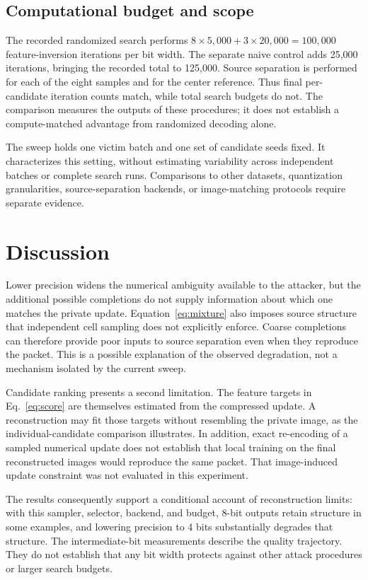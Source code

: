 \documentclass[10pt,twocolumn]{article}
\begin{document}
\subsection{Computational budget and scope}
\label{sec:budget}
The recorded randomized search performs
$8\times5{,}000+3\times20{,}000=100{,}000$ feature-inversion iterations
per bit width. The separate naive control adds 25,000 iterations,
bringing the recorded total to 125,000. Source separation is performed
for each of the eight samples and for the center reference. Thus final
per-candidate iteration counts match, while total search budgets do not.
The comparison measures the outputs of these procedures; it does not
establish a compute-matched advantage from randomized decoding alone.

The sweep holds one victim batch and one set of candidate seeds fixed.
It characterizes this setting, without estimating variability across
independent batches or complete search runs. Comparisons to other
datasets, quantization granularities, source-separation backends, or
image-matching protocols require separate evidence.

\section{Discussion}
\label{sec:discussion}
Lower precision widens the numerical ambiguity available to the attacker,
but the additional possible completions do not supply information about
which one matches the private update. Equation~\ref{eq:mixture} also
imposes source structure that independent cell sampling does not
explicitly enforce. Coarse completions can therefore provide poor
inputs to source separation even when they reproduce the packet.
This is a possible explanation of the observed degradation, not a
mechanism isolated by the current sweep.

Candidate ranking presents a second limitation. The feature targets in
Eq.~\ref{eq:score} are themselves estimated from the compressed update.
A reconstruction may fit those targets without resembling the private
image, as the individual-candidate comparison illustrates. In addition,
exact re-encoding of a sampled numerical update does not establish that
local training on the final reconstructed images would reproduce the
same packet. That image-induced update constraint was not evaluated in
this experiment.

The results consequently support a conditional account of reconstruction
limits: with this sampler, selector, backend, and budget, 8-bit outputs
retain structure in some examples, and lowering precision to 4 bits
substantially degrades that structure. The intermediate-bit measurements
describe the quality trajectory. They do not establish that any bit
width protects against other attack procedures or larger search budgets.
\end{document}
